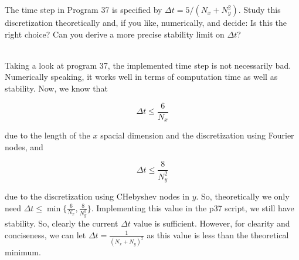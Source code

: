 The time step in Program 37 is specified by $\Delta t = 5/(N_x + N_y^2 )$. Study this discretization 
theoretically  and, if you like, numerically, and decide: Is this the right choice? Can you derive 
a more precise stability limit on $\Delta t$?\\

\begin{solution}\renewcommand{\qedsymbol}{}\ \\
    Taking a look at program 37, the implemented time step is not necessarily bad. Numerically speaking,
    it works well in terms of computation time as well as stability. Now, we know that
    
    $$\Delta t\leq\frac{6}{N_x}$$

    due to the length of the $x$ spacial dimension and the discretization using Fourier nodes, and

    $$\Delta t\leq\frac{8}{N_y^2}$$

    due to the discretization using CHebyshev nodes in $y$. So, theoretically we only need
    $\Delta t\leq\min\{\frac{6}{N_x},\frac{8}{N_y^2}\}$. Implementing this value in the p37 script, we
    still have stability. So, clearly the current $\Delta t$ value is sufficient. However, for clearity
    and conciseness, we can let $\Delta t=\frac{1}{(N_x+N_y)^2}$ as this value is less than the
    theoretical minimum.
\end{solution}